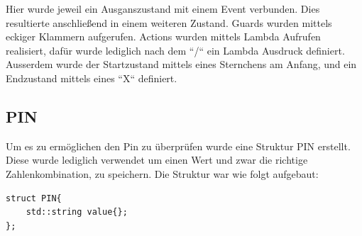 \documentclass{report}
\begin{document}
Hier wurde jeweil ein Ausganszustand mit einem Event verbunden. Dies resultierte anschließend in einem weiteren Zustand. Guards wurden mittels eckiger Klammern aufgerufen. Actions wurden mittels Lambda Aufrufen realisiert, dafür wurde lediglich nach dem ``/`` ein Lambda Ausdruck definiert. Ausserdem wurde der Startzustand mittels eines Sternchens am Anfang, und ein Endzustand mittels eines ``X`` definiert.
\subsection{PIN}
Um es zu ermöglichen den Pin zu überprüfen wurde eine Struktur PIN erstellt. Diese wurde lediglich verwendet um einen Wert und zwar die richtige Zahlenkombination, zu speichern. Die Struktur war wie folgt aufgebaut:
\begin{lstlisting}
struct PIN{
    std::string value{};
};
\end{lstlisting}
\end{document}
